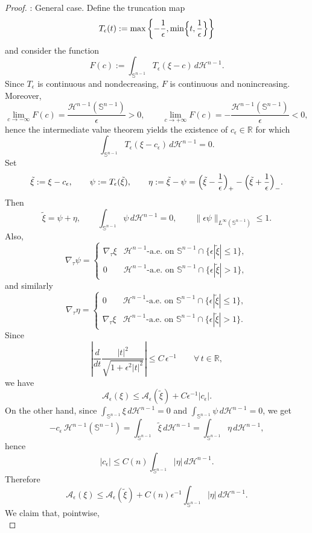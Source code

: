 \documentclass[reqno,11pt]{amsart}
\def\ez{\epsilon}
\numberwithin{equation}{section}
\theoremstyle{remark}
\begin{document}
\begin{proof}
\medskip
{}: General case.
Define the truncation map
$$
T_\epsilon(t):=\max\left\{-\frac1\epsilon,\min\Bigl\{t,\frac1\epsilon\Bigr\}\right\}
$$
and consider the function
$$
F(c):=\int_{\mathbb S^{n-1}} T_\epsilon(\xi-c)\,d\mathscr H^{n-1}.
$$
Since $T_\epsilon$ is continuous and nondecreasing, $F$ is continuous and nonincreasing.
Moreover,
$$
\lim_{c\to-\infty}F(c)=\frac{\mathscr H^{n-1}(\mathbb S^{n-1})}{\epsilon}>0,
\qquad
\lim_{c\to+\infty}F(c)=-\frac{\mathscr H^{n-1}(\mathbb S^{n-1})}{\epsilon}<0,
$$
hence the intermediate value theorem yields the existence of $c_\epsilon\in\mathbb R$ for which 
$$
\int_{\mathbb S^{n-1}} T_\epsilon(\xi-c_\epsilon)\,d\mathscr H^{n-1}=0.
$$
Set
$$
\tilde\xi:=\xi-c_\epsilon,\qquad
\psi:=T_\epsilon(\tilde\xi),\qquad
\eta:=\tilde\xi-\psi
=
\Bigl(\tilde\xi-\frac 1 \ez \Bigr)_+-\Bigl(\tilde\xi+\frac 1 \ez \Bigr)_-.
$$
Then
$$
\tilde\xi=\psi+\eta,\qquad \int_{\mathbb S^{n-1}}\psi\,d\mathscr H^{n-1}=0,
\qquad \|\epsilon\psi\|_{L^\infty(\mathbb S^{n-1})}\le 1.
$$
Also,
$$
\nabla_\tau\psi=\left\{
\begin{array}{ll}
\nabla_\tau\xi& \text{$\mathscr H^{n-1}$-a.e. on $\mathbb S^{n-1}\cap \{\ez|\tilde\xi|\leq  1\}$},\\
0& \text{$\mathscr H^{n-1}$-a.e. on $\mathbb S^{n-1}\cap \{\ez|\tilde\xi|> 1\}$},
\end{array}\right.
$$
and similarly
$$
\nabla_\tau\eta=\left\{
\begin{array}{ll}
0& \text{$\mathscr H^{n-1}$-a.e. on $\mathbb S^{n-1}\cap \{\ez|\tilde\xi|\leq  1\}$},\\
\nabla_\tau\xi& \text{$\mathscr H^{n-1}$-a.e. on $\mathbb S^{n-1}\cap \{\ez|\tilde\xi|> 1\}$}.
\end{array}\right.
$$
Since
$$
\left|\frac{d}{dt}\frac{|t|^2}{\sqrt{1+\epsilon^2|t|^2}}\right|
\le C\,\epsilon^{-1}\qquad\forall\,t\in\mathbb R,
$$
we have
$$
\mathcal A_\epsilon(\xi)\le \mathcal A_\epsilon(\tilde\xi)+C\epsilon^{-1}|c_\epsilon|.
$$
On the other hand, since $\int_{\mathbb S^{n-1}}\xi\,d\mathscr H^{n-1}=0$ and
$\int_{\mathbb S^{n-1}}\psi\,d\mathscr H^{n-1}=0$, we get
$$
-c_\epsilon\,\mathscr H^{n-1}(\mathbb S^{n-1})
=\int_{\mathbb S^{n-1}}\tilde\xi\,d\mathscr H^{n-1}
=\int_{\mathbb S^{n-1}}\eta\,d\mathscr H^{n-1},
$$
hence
$$
|c_\epsilon|\le C(n)\int_{\mathbb S^{n-1}}|\eta|\,d\mathscr H^{n-1}.
$$
Therefore
$$
\mathcal A_\epsilon(\xi)\le \mathcal A_\epsilon(\tilde\xi)+C(n)\epsilon^{-1}\int_{\mathbb S^{n-1}}|\eta|\,d\mathscr H^{n-1}.
$$
We claim that, pointwise,
\begin{equation}\label{pointwise tilde xi}

\end{equation}
\end{proof}
\end{document}
